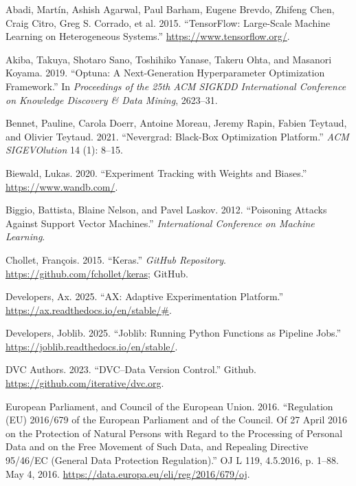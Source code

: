 \documentclass[
]{article}
\newlength{\cslhangindent}
\newlength{\cslentryspacingunit} %
\newenvironment{CSLReferences}[2] %
 {%
  \setlength{\parindent}{0pt}
  \ifodd #1
  \let\oldpar\par
  \def\par{\hangindent=\cslhangindent\oldpar}
  \fi
  \setlength{\parskip}{#2\cslentryspacingunit}
 }%
 {}
\begin{document}
\hypertarget{refs}{}
\begin{CSLReferences}{1}{0}
\leavevmode{}%
Abadi, Martín, Ashish Agarwal, Paul Barham, Eugene Brevdo, Zhifeng Chen,
Craig Citro, Greg S. Corrado, et al. 2015. {``{TensorFlow}: Large-Scale
Machine Learning on Heterogeneous Systems.''}
\url{https://www.tensorflow.org/}.

\leavevmode{}%
Akiba, Takuya, Shotaro Sano, Toshihiko Yanase, Takeru Ohta, and Masanori
Koyama. 2019. {``Optuna: A Next-Generation Hyperparameter Optimization
Framework.''} In \emph{Proceedings of the 25th ACM SIGKDD International
Conference on Knowledge Discovery \& Data Mining}, 2623--31.

\leavevmode{}%
Bennet, Pauline, Carola Doerr, Antoine Moreau, Jeremy Rapin, Fabien
Teytaud, and Olivier Teytaud. 2021. {``Nevergrad: Black-Box Optimization
Platform.''} \emph{ACM SIGEVOlution} 14 (1): 8--15.

\leavevmode{}%
Biewald, Lukas. 2020. {``Experiment Tracking with Weights and Biases.''}
\url{https://www.wandb.com/}.

\leavevmode{}%
Biggio, Battista, Blaine Nelson, and Pavel Laskov. 2012. {``Poisoning
Attacks Against Support Vector Machines.''} \emph{International
Conference on Machine Learning}.

\leavevmode{}%
Chollet, François. 2015. {``Keras.''} \emph{GitHub Repository}.
\url{https://github.com/fchollet/keras}; GitHub.

\leavevmode{}%
Developers, Ax. 2025. {``AX: Adaptive Experimentation Platform.''}
\url{https://ax.readthedocs.io/en/stable/\#}.

\leavevmode{}%
Developers, Joblib. 2025. {``Joblib: Running Python Functions as
Pipeline Jobs.''} \url{https://joblib.readthedocs.io/en/stable/}.

\leavevmode{}%
DVC Authors. 2023. {``{DVC}--{Data Version Control}.''} Github.
\url{https://github.com/iterative/dvc.org}.

\leavevmode{}%
European Parliament, and Council of the European Union. 2016.
{``Regulation ({EU}) 2016/679 of the {European} {Parliament} and of the
{Council}. Of 27 {April} 2016 on the Protection of Natural Persons with
Regard to the Processing of Personal Data and on the Free Movement of
Such Data, and Repealing {Directive} 95/46/{EC} ({General} {Data}
{Protection} {Regulation}).''} OJ L 119, 4.5.2016, p. 1--88. May 4,
2016. \url{https://data.europa.eu/eli/reg/2016/679/oj}.


\end{CSLReferences}
\end{document}
